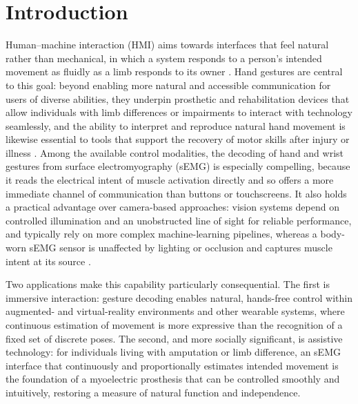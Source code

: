 \documentclass[12pt,DIV16,BCOR12mm,a4paper,footinclude=false,headinclude,parskip=half-,twoside,openright,cleardoublepage=empty,toc=index,bibliography=totoc,listof=totoc]{scrreprt}
\title{\maintitle}%
\subtitle{\translatedtitle}
\author{
\large
  \ifthenelse{\equal{\doclang}{german}}{
  \begin{tabular}{rp{7cm}}
    \Large 
    Autor:      & \Large \student \vspace*{2mm}\\
    Ausgabe:    & \startdate \\
    Abgabe:     & \submission \vspace*{3mm}\\
    Betreuer:   & \tutor \vspace*{2mm}\\
    Stichworte: & \keywords
  \end{tabular}
  }{
  \begin{tabular}{rp{7cm}}
    \Large 
    Author:             & \Large \student \vspace*{2mm}\\
    Date of work begin: & \startdate \\
    Date of submission: & \submission \vspace*{3mm}\\
    Supervisor:         & \tutor \vspace*{2mm}\\
    Keywords:           & \keywords
  \end{tabular}
  }
  \bugfix
}
\date{}
\numberwithin{equation}{chapter}
\begin{document}
\maketitle
\cleardoublepage
{} %
\tableofcontents
\cleardoublepage
\setcounter{page}{1}
\raggedbottom

\chapter{Introduction}
    Human--machine interaction (HMI) aims towards interfaces that feel natural rather
    than mechanical, in which a system responds to a person's intended movement as
    fluidly as a limb responds to its owner \cite{zhengSurfaceElectromyographyNatural2022,valchevaSurfaceEMGDriven2026}.
    Hand gestures are central to this goal: beyond enabling more natural and accessible communication
    for users of diverse abilities, they underpin prosthetic and rehabilitation devices that allow
    individuals with limb differences or impairments to interact with technology
    seamlessly, and the ability to interpret and reproduce natural hand movement is
    likewise essential to tools that support the recovery of motor skills after injury
    or illness \cite{niSurveyHandGesture2024}. Among the available control modalities,
    the decoding of hand and wrist gestures from surface electromyography (sEMG) is
    especially compelling, because it reads the electrical intent of muscle activation
    directly and so offers a more immediate channel of communication than buttons or
    touchscreens. It also holds a practical advantage over camera-based approaches:
    vision systems depend on controlled illumination and an unobstructed line of sight
    for reliable performance, and typically rely on more complex machine-learning
    pipelines, whereas a body-worn sEMG sensor is unaffected by lighting or occlusion
    and captures muscle intent at its source \cite{niSurveyHandGesture2024}.
    
    Two applications make this capability particularly consequential. The first is immersive
    interaction: gesture decoding enables natural, hands-free control within
    augmented- and virtual-reality environments and other wearable systems, where
    continuous estimation of movement is more expressive than the recognition of a
    fixed set of discrete poses. The second, and more socially significant, is
    assistive technology: for individuals living with amputation or limb difference, an
    sEMG interface that continuously and proportionally estimates intended movement is
    the foundation of a myoelectric prosthesis that can be controlled smoothly and
    intuitively, restoring a measure of natural function and independence.
\end{document}
